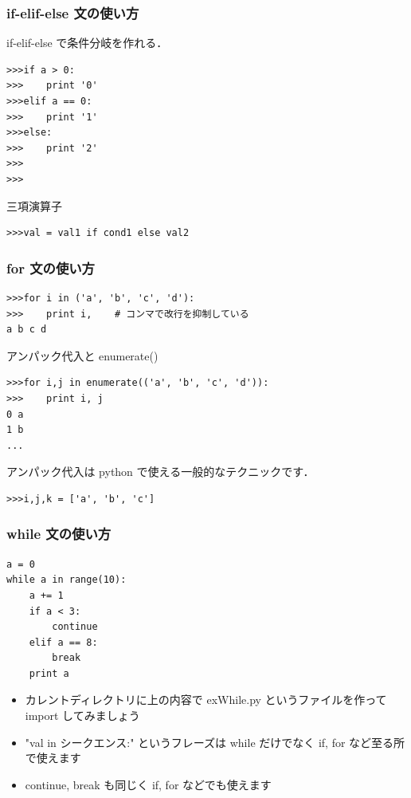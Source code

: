 \begin{frame}[t,fragile]
\frametitle{if-elif-else 文の使い方}
if-elif-else で条件分岐を作れる．
\begin{lstlisting}[stepnumber=1]
>>>if a > 0:
>>>    print '0'
>>>elif a == 0:
>>>    print '1'
>>>else:
>>>    print '2'
>>>
>>>
\end{lstlisting}

三項演算子

\begin{lstlisting}
>>>val = val1 if cond1 else val2
\end{lstlisting}

\end{frame}

\begin{frame}[t,fragile]
\frametitle{for 文の使い方}
\begin{lstlisting}
>>>for i in ('a', 'b', 'c', 'd'):
>>>    print i,    # コンマで改行を抑制している
a b c d
\end{lstlisting}

アンパック代入と enumerate()
\begin{lstlisting}
>>>for i,j in enumerate(('a', 'b', 'c', 'd')):
>>>    print i, j
0 a
1 b
...
\end{lstlisting}
アンパック代入は python で使える一般的なテクニックです．
\begin{lstlisting}
>>>i,j,k = ['a', 'b', 'c']
\end{lstlisting}
\end{frame}

\begin{frame}[t,fragile]
\frametitle{while 文の使い方}
\begin{lstlisting}
a = 0
while a in range(10):
    a += 1
    if a < 3:
        continue
    elif a == 8:
        break
    print a

\end{lstlisting}

\begin{itemize}
\item カレントディレクトリに上の内容で exWhile.py というファイルを作って import してみましょう
\item "val in シークエンス:" というフレーズは while だけでなく if, for など至る所で使えます
\item continue, break も同じく if, for などでも使えます
\end{itemize}

\end{frame}
